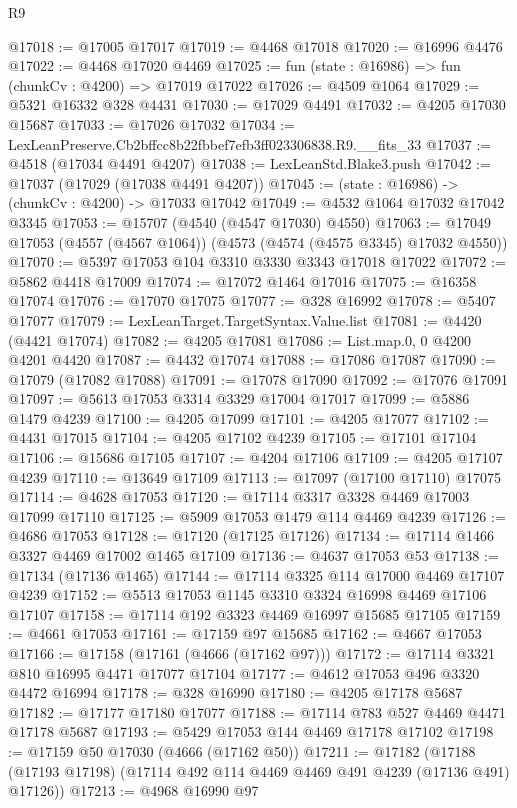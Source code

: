 \begin{lexlean}{R9}
\begin{coremodule}
@17018 := @17005 @17017
@17019 := @4468 @17018
@17020 := @16996 @4476
@17022 := @4468 @17020 @4469
@17025 := fun (state : @16986) => fun (chunkCv : @4200) => @17019 @17022
@17026 := @4509 @1064
@17029 := @5321 @16332 @328 @4431
@17030 := @17029 @4491
@17032 := @4205 @17030 @15687
@17033 := @17026 @17032
@17034 := LexLeanPreserve.Cb2bffcc8b22fbbef7efb3ff023306838.R9.__fits_33
@17037 := @4518 (@17034 @4491 @4207)
@17038 := LexLeanStd.Blake3.push
@17042 := @17037 (@17029 (@17038 @4491 @4207))
@17045 := (state : @16986) -> (chunkCv : @4200) -> @17033 @17042
@17049 := @4532 @1064 @17032 @17042 @3345
@17053 := @15707 (@4540 (@4547 @17030) @4550)
@17063 := @17049 @17053 (@4557 (@4567 @1064)) (@4573 (@4574 (@4575 @3345) @17032 @4550))
@17070 := @5397 @17053 @104 @3310 @3330 @3343 @17018 @17022
@17072 := @5862 @4418 @17009
@17074 := @17072 @1464 @17016
@17075 := @16358 @17074
@17076 := @17070 @17075
@17077 := @328 @16992
@17078 := @5407 @17077
@17079 := LexLeanTarget.TargetSyntax.Value.list
@17081 := @4420 (@4421 @17074)
@17082 := @4205 @17081
@17086 := List.map.{0, 0} @4200 @4201 @4420
@17087 := @4432 @17074
@17088 := @17086 @17087
@17090 := @17079 (@17082 @17088)
@17091 := @17078 @17090
@17092 := @17076 @17091
@17097 := @5613 @17053 @3314 @3329 @17004 @17017
@17099 := @5886 @1479 @4239
@17100 := @4205 @17099
@17101 := @4205 @17077
@17102 := @4431 @17015
@17104 := @4205 @17102 @4239
@17105 := @17101 @17104
@17106 := @15686 @17105
@17107 := @4204 @17106
@17109 := @4205 @17107 @4239
@17110 := @13649 @17109
@17113 := @17097 (@17100 @17110) @17075
@17114 := @4628 @17053
@17120 := @17114 @3317 @3328 @4469 @17003 @17099 @17110
@17125 := @5909 @17053 @1479 @114 @4469 @4239
@17126 := @4686 @17053
@17128 := @17120 (@17125 @17126)
@17134 := @17114 @1466 @3327 @4469 @17002 @1465 @17109
@17136 := @4637 @17053 @53
@17138 := @17134 (@17136 @1465)
@17144 := @17114 @3325 @114 @17000 @4469 @17107 @4239
@17152 := @5513 @17053 @1145 @3310 @3324 @16998 @4469 @17106 @17107
@17158 := @17114 @192 @3323 @4469 @16997 @15685 @17105
@17159 := @4661 @17053
@17161 := @17159 @97 @15685
@17162 := @4667 @17053
@17166 := @17158 (@17161 (@4666 (@17162 @97)))
@17172 := @17114 @3321 @810 @16995 @4471 @17077 @17104
@17177 := @4612 @17053 @496 @3320 @4472 @16994
@17178 := @328 @16990
@17180 := @4205 @17178 @5687
@17182 := @17177 @17180 @17077
@17188 := @17114 @783 @527 @4469 @4471 @17178 @5687
@17193 := @5429 @17053 @144 @4469 @17178 @17102
@17198 := @17159 @50 @17030 (@4666 (@17162 @50))
@17211 := @17182
    (@17188 (@17193 @17198) (@17114 @492 @114 @4469 @4469 @491 @4239 (@17136 @491) @17126))
@17213 := @4968 @16990 @97

\end{coremodule}
\end{lexlean}
